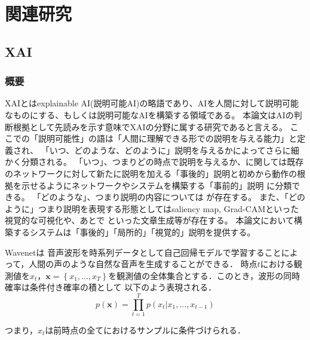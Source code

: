 \chapter{関連研究}

\section{XAI}

\subsection{概要}
XAIとはexplainable AI(説明可能AI)の略語であり、AIを人間に対して説明可能なものにする、もしくは説明可能なAIを構築する領域である。
本論文はAIの判断根拠として先読みを示す意味でXAIの分野に属する研究であると言える。
ここでの「説明可能性」の語は「人間に理解できる形での説明を与える能力」\cite{oord2016wavenet}と定義され、
「いつ、どのような、どのように」説明を与えるかによってさらに細かく分類される。
「いつ」、つまりどの時点で説明を与えるか、に関しては既存のネットワークに対して新たに説明を加える「事後的」説明と初めから動作の根拠を示せるようにネットワークやシステムを構築する「事前的」説明
に分類できる\cite{oord2016wavenet}。
「どのような」、つまり説明の内容については
が存在する。
また、「どのように」つまり説明を表現する形態としてはsaliency map, Grad-CAM\cite{oord2016wavenet}といった視覚的な可視化や、あとで
\cite{oord2016wavenet}といった文章生成等が存在する。
本論文において構築するシステムは「事後的」「局所的」「視覚的」説明を提供する。

Wavenet\cite{oord2016wavenet}は
音声波形を時系列データとして自己回帰モデルで学習することによって，人間の声のような自然な音声を生成することができる．
時点$t$における観測値を$x_t$，$\bm{x} = \left\{ x_1, ..., x_T \right\}$を観測値の全体集合とする．このとき，波形の同時確率は条件付き確率の積として
以下のよう表現される．
\begin{equation}
	p(\bm{x}) = \prod_{t=1}^T p(x_t | x_1, ..., x_{t-1})
\end{equation}

つまり，$x_t$は前時点の全てにおけるサンプルに条件づけられる．

